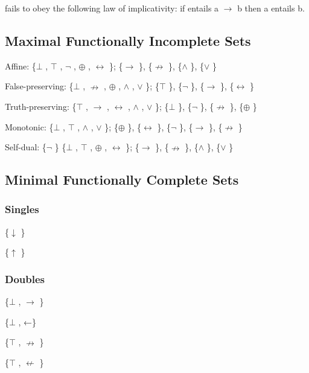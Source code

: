 fails to obey the following law of implicativity: if entails a $\to$  b then
a entails b.

\hypertarget{maximal-functionally-incomplete-sets}{%
\subsection{Maximal Functionally Incomplete
Sets}\label{maximal-functionally-incomplete-sets}}

Affine: \{$\bot$ , $\top$ , $\neg$ , $\oplus$ , $\leftrightarrow$ \}; \{$\to$ \}, \{$\nrightarrow$ \}, \{$\land$ \}, \{$\lor$ \}

False-preserving: \{$\bot$ , $\nrightarrow$ , $\oplus$ , $\land$ , $\lor$ \}; \{$\top$ \}, \{$\neg$ \}, \{$\to$ \}, \{$\leftrightarrow$ \}

Truth-preserving: \{$\top$ , $\to$ , $\leftrightarrow$ , $\land$ , $\lor$ \}; \{$\bot$ \}, \{$\neg$ \}, \{$\nrightarrow$ \}, \{$\oplus$ \}

Monotonic: \{$\bot$ , $\top$ , $\land$ , $\lor$ \}; \{$\oplus$ \}, \{$\leftrightarrow$ \}, \{$\neg$ \}, \{$\to$ \}, \{$\nrightarrow$ \}

Self-dual: \{$\neg$ \} \{$\bot$ , $\top$ , $\oplus$ , $\leftrightarrow$ \}; \{$\to$ \}, \{$\nrightarrow$ \}, \{$\land$ \}, \{$\lor$ \}

\hypertarget{minimal-functionally-complete-sets}{%
\subsection{Minimal Functionally Complete
Sets}\label{minimal-functionally-complete-sets}}

\hypertarget{singles}{%
\subsubsection{Singles}\label{singles}}

\{$\downarrow$ \}

\{$\uparrow$ \}

\hypertarget{doubles}{%
\subsubsection{Doubles}\label{doubles}}

\{$\bot$ , $\to$ \}

\{$\bot$ , ←\}

\{$\top$ , $\nrightarrow$ \}

\{$\top$ , $\nleftarrow$ \}

